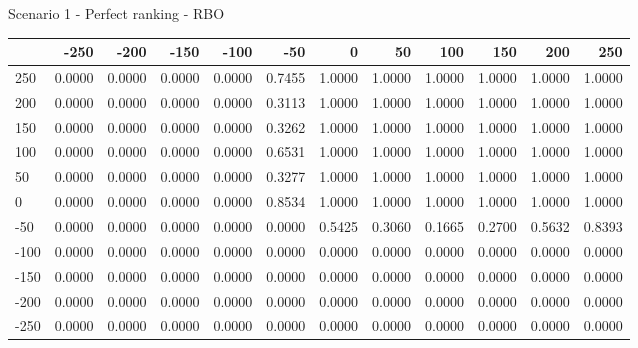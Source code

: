 Scenario 1 - Perfect ranking - RBO
\begin{tabular}{lrrrrrrrrrrr}
\toprule
{} &   -250 &   -200 &   -150 &   -100 &   -50  &    0   &    50  &    100 &    150 &    200 &    250 \\
\midrule
 250 & 0.0000 & 0.0000 & 0.0000 & 0.0000 & 0.7455 & 1.0000 & 1.0000 & 1.0000 & 1.0000 & 1.0000 & 1.0000 \\
 200 & 0.0000 & 0.0000 & 0.0000 & 0.0000 & 0.3113 & 1.0000 & 1.0000 & 1.0000 & 1.0000 & 1.0000 & 1.0000 \\
 150 & 0.0000 & 0.0000 & 0.0000 & 0.0000 & 0.3262 & 1.0000 & 1.0000 & 1.0000 & 1.0000 & 1.0000 & 1.0000 \\
 100 & 0.0000 & 0.0000 & 0.0000 & 0.0000 & 0.6531 & 1.0000 & 1.0000 & 1.0000 & 1.0000 & 1.0000 & 1.0000 \\
 50  & 0.0000 & 0.0000 & 0.0000 & 0.0000 & 0.3277 & 1.0000 & 1.0000 & 1.0000 & 1.0000 & 1.0000 & 1.0000 \\
 0   & 0.0000 & 0.0000 & 0.0000 & 0.0000 & 0.8534 & 1.0000 & 1.0000 & 1.0000 & 1.0000 & 1.0000 & 1.0000 \\
-50  & 0.0000 & 0.0000 & 0.0000 & 0.0000 & 0.0000 & 0.5425 & 0.3060 & 0.1665 & 0.2700 & 0.5632 & 0.8393 \\
-100 & 0.0000 & 0.0000 & 0.0000 & 0.0000 & 0.0000 & 0.0000 & 0.0000 & 0.0000 & 0.0000 & 0.0000 & 0.0000 \\
-150 & 0.0000 & 0.0000 & 0.0000 & 0.0000 & 0.0000 & 0.0000 & 0.0000 & 0.0000 & 0.0000 & 0.0000 & 0.0000 \\
-200 & 0.0000 & 0.0000 & 0.0000 & 0.0000 & 0.0000 & 0.0000 & 0.0000 & 0.0000 & 0.0000 & 0.0000 & 0.0000 \\
-250 & 0.0000 & 0.0000 & 0.0000 & 0.0000 & 0.0000 & 0.0000 & 0.0000 & 0.0000 & 0.0000 & 0.0000 & 0.0000 \\
\bottomrule
\end{tabular}

